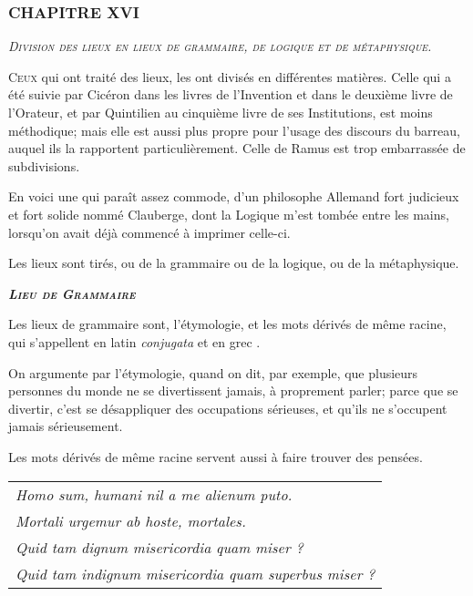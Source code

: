 \subsubsection{\centering \Large CHAPITRE XVI}
\begin{center}\emph{\large\scshape Division des lieux en lieux de grammaire, de logique et de métaphysique.}\end{center}

	\lettrine{C}{eux} qui ont traité des lieux, les ont divisés en différentes matières. Celle qui a été suivie par Cicéron dans les livres de l'Invention et dans le deuxième livre de l'Orateur, et par Quintilien au cinquième livre de ses Institutions, est moins méthodique; mais elle est aussi plus propre pour l'usage des discours du barreau, auquel ils la rapportent particulièrement. Celle de Ramus est trop embarrassée de subdivisions.

En voici une qui paraît assez commode, d'un philosophe Allemand fort judicieux et fort solide nommé Clauberge, dont la Logique m'est tombée entre les mains, lorsqu'on avait déjà commencé à imprimer celle-ci.

Les lieux sont tirés, ou de la grammaire ou de la logique, ou
de la métaphysique.

\begin{center}\emph{\bfseries\scshape Lieu de Grammaire}\end{center}

	Les lieux de grammaire sont, l'étymologie, et les mots dérivés de même racine, qui s'appellent en latin \emph{conjugata} et en grec \emph{{}}.

On argumente par l'étymologie, quand on dit, par exemple, que plusieurs personnes du monde ne se divertissent jamais, à proprement parler; parce que se divertir, c'est se désappliquer des occupations sérieuses, et qu'ils ne s'occupent jamais sérieusement.

Les mots dérivés de même racine servent aussi à faire trouver des pensées.

	\begin{tabularx}{\textwidth}{X}
		\emph{Homo sum, humani nil a me alienum puto.} \\
		\emph{Mortali urgemur ab hoste, mortales.} \\
		\emph{Quid tam dignum misericordia quam miser ?} \\
		\emph{Quid tam indignum misericordia quam superbus miser ?} \\
	\end{tabularx}

